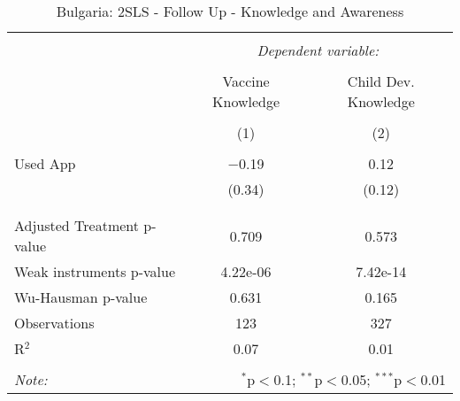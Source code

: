 
\begin{table}[!htbp] \centering 
  \caption{Bulgaria: 2SLS - Follow Up - Knowledge and Awareness} 
  \label{tbl:Bulgaria: 2SLS - Follow Up - Knowledge and Awareness} 
\begin{tabular}{@{\extracolsep{5pt}}lcc} 
\\[-1.8ex]\hline 
\hline \\[-1.8ex] 
 & \multicolumn{2}{c}{\textit{Dependent variable:}} \\ 
\cline{2-3} 
\\[-1.8ex] & Vaccine Knowledge & Child Dev. Knowledge \\ 
\\[-1.8ex] & (1) & (2)\\ 
\hline \\[-1.8ex] 
 Used App & $-$0.19 & 0.12 \\ 
  & (0.34) & (0.12) \\ 
  & & \\ 
\hline \\[-1.8ex] 
Adjusted Treatment p-value & 0.709 & 0.573 \\ 
Weak instruments p-value & 4.22e-06 & 7.42e-14 \\ 
Wu-Hausman p-value & 0.631 & 0.165 \\ 
Observations & 123 & 327 \\ 
R$^{2}$ & 0.07 & 0.01 \\ 
\hline 
\hline \\[-1.8ex] 
\textit{Note:}  & \multicolumn{2}{r}{$^{*}$p$<$0.1; $^{**}$p$<$0.05; $^{***}$p$<$0.01} \\ 
\end{tabular} 
\end{table} 
